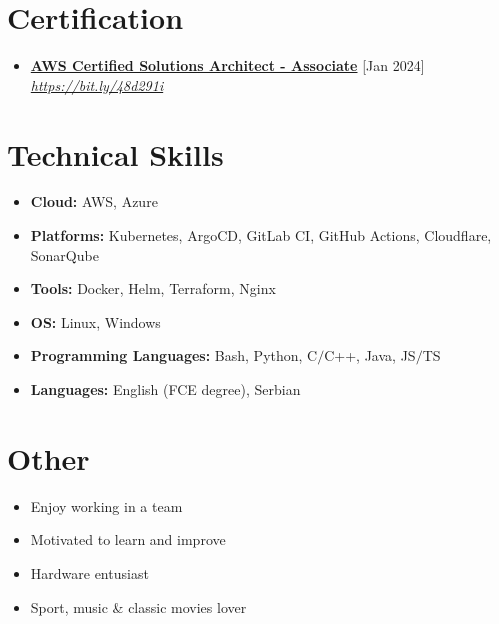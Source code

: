 \documentclass[12pt,a4paper]{moderncv}
\begin{document}
\section{Certification}

\begin{itemize}
	\item \textbf{\href{https://aws.amazon.com/certification/certified-solutions-architect-associate/}{AWS Certified Solutions Architect - Associate}} \hfill [Jan 2024]\\
	\textit{\href{https://cp.certmetrics.com/amazon/en/public/verify/credential/c546a05a82c243b895493ff0316a1e67}{https://bit.ly/48d291i}}
	
\end{itemize}


\section{Technical Skills}

\begin{itemize}
		
	\item \textbf{Cloud: } AWS, Azure
	\item \textbf{Platforms: } Kubernetes, ArgoCD, GitLab CI, GitHub Actions, Cloudflare, SonarQube
	\item \textbf{Tools: } Docker, Helm, Terraform, Nginx
	\item \textbf{OS: } Linux, Windows
	\item \textbf{Programming Languages: } Bash, Python, C$\slash$C++, Java, JS$\slash$TS
	\item \textbf{Languages: } English (FCE degree), Serbian
	
\end{itemize}

\section{Other}
	\vspace{-1em}
	\begin{multicols*}{2}
		\begin{itemize}
			\setlength\itemsep{-1.2pt}
			\item Enjoy working in a team
			\item Motivated to learn and improve
			\item Hardware entusiast			
			\item Sport, music \& classic movies lover
		\end{itemize}		
	\end{multicols*}

\end{document}
